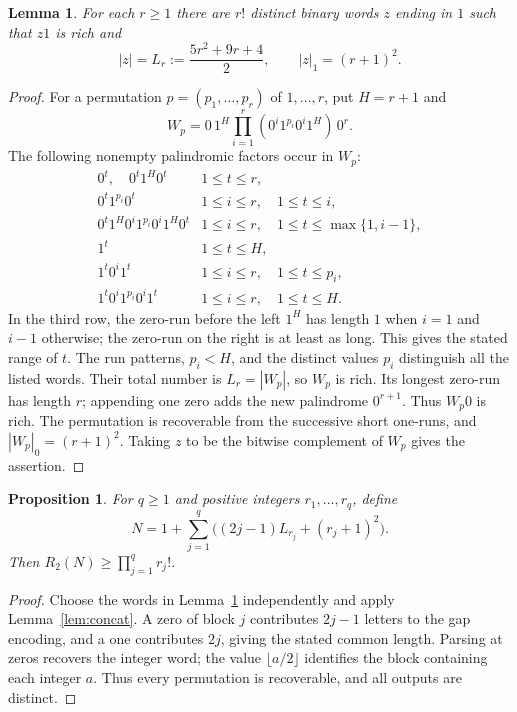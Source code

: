\documentclass[10pt]{article}
\newtheorem{lemma}[theorem]{Lemma}
\newtheorem{proposition}[theorem]{Proposition}
\begin{document}
\begin{lemma}\label{lem:permutation}
For each $r\ge1$ there are $r!$ distinct binary words $z$ ending in $1$
such that $z1$ is rich and
\begin{equation}\label{eq:composition}
 |z|=L_r:=\frac{5r^2+9r+4}{2},\qquad |z|_1=(r+1)^2.
\end{equation}
\end{lemma}
\begin{proof}
For a permutation $p=(p_1,\ldots,p_r)$ of $1,\ldots,r$, put $H=r+1$ and
\[
 W_p=0\,1^H\prod_{i=1}^{r}(0^i1^{p_i}0^i1^H)\,0^r.
\]
The following nonempty palindromic factors occur in $W_p$:
\[
\begin{array}{ll}
 0^t,\quad 0^t1^H0^t & 1\le t\le r,\\
 0^t1^{p_i}0^t & 1\le i\le r,\quad 1\le t\le i,\\
 0^t1^H0^i1^{p_i}0^i1^H0^t
   & 1\le i\le r,\quad 1\le t\le\max\{1,i-1\},\\
 1^t & 1\le t\le H,\\
 1^t0^i1^t & 1\le i\le r,\quad 1\le t\le p_i,\\
 1^t0^i1^{p_i}0^i1^t & 1\le i\le r,\quad 1\le t\le H.
\end{array}
\]
In the third row, the zero-run before the left $1^H$ has length $1$
when $i=1$ and $i-1$ otherwise; the zero-run on the right is at least
as long. This gives the stated range of $t$.
The run patterns, $p_i<H$, and the distinct values $p_i$ distinguish
all the listed words. Their total number is $L_r=|W_p|$, so $W_p$ is rich.
Its longest zero-run has length $r$; appending one zero adds the new
palindrome $0^{r+1}$. Thus $W_p0$ is rich.
The permutation is recoverable from the successive short one-runs,
and $|W_p|_0=(r+1)^2$. Taking $z$ to be the bitwise complement of $W_p$
gives the assertion.
\end{proof}

\begin{proposition}\label{prop:product}
For $q\ge1$ and positive integers $r_1,\ldots,r_q$, define
\[
 N=1+\sum_{j=1}^{q}\bigl((2j-1)L_{r_j}+(r_j+1)^2\bigr).
\]
Then $R_2(N)\ge\prod_{j=1}^{q}r_j!$.
\end{proposition}
\begin{proof}
Choose the words in Lemma~\ref{lem:permutation} independently and apply
Lemma~\ref{lem:concat}. A zero of block $j$ contributes $2j-1$ letters
to the gap encoding, and a one contributes $2j$, giving the stated
common length. Parsing at zeros recovers the integer word; the value
$\lfloor a/2\rfloor$ identifies the block containing each integer $a$.
Thus every permutation is recoverable, and all outputs are distinct.
\end{proof}
\end{document}
